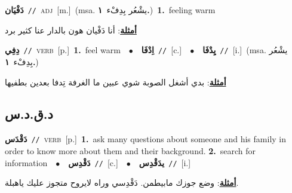 \documentclass[10pt,a4paper,twoside]{article} %
\begin{document}
\begin{multicols}{2}
{\setlength\topsep{0pt}\textbf{\foreignlanguage{arabic}{دَفْيَان}}\ {\color{gray}\texttt{//}\color{black}}\ \textsc{adj}\ [m.]\ \color{gray}(msa. \foreignlanguage{arabic}{يشْعُر بِدِفْء}~\foreignlanguage{arabic}{\textbf{١.}})\color{black}\ \textbf{1.}~feeling warm\  \begin{flushright}\color{gray}\foreignlanguage{arabic}{\textbf{\underline{\foreignlanguage{arabic}{أمثلة}}}: أنا دَفْيان هون بالدار عنا كثير برد}\end{flushright}\color{black}} \vspace{2mm}

{\setlength\topsep{0pt}\textbf{\foreignlanguage{arabic}{دِفِي}}\ {\color{gray}\texttt{//}\color{black}}\ \textsc{verb}\ [p.]\ \textbf{1.}~feel warm\ \ $\bullet$\ \ \setlength\topsep{0pt}\textbf{\foreignlanguage{arabic}{اِدْفَا}}\ {\color{gray}\texttt{//}\color{black}}\ [c.]\ \ $\bullet$\ \ \setlength\topsep{0pt}\textbf{\foreignlanguage{arabic}{يِدْفَا}}\ {\color{gray}\texttt{//}\color{black}}\ [i.]\ \color{gray}(msa. \foreignlanguage{arabic}{يشْعُر بِدِفْء}~\foreignlanguage{arabic}{\textbf{١.}})\color{black}\  \begin{flushright}\color{gray}\foreignlanguage{arabic}{\textbf{\underline{\foreignlanguage{arabic}{أمثلة}}}: بدي أشغل الصوبة شوي عبين ما الغرفة تِدفا بعدين بطفيها}\end{flushright}\color{black}} \vspace{2mm}

\vspace{-3mm}
\subsection*{\color{blue}\foreignlanguage{arabic}{د.ق.د.س}\color{blue}{}} 

{\setlength\topsep{0pt}\textbf{\foreignlanguage{arabic}{دَقْدَس}}\ {\color{gray}\texttt{//}\color{black}}\ \textsc{verb}\ [p.]\ \textbf{1.}~ask many questions about someone and his family in order to know more about them and their background.  \textbf{2.}~search for information\ \ $\bullet$\ \ \setlength\topsep{0pt}\textbf{\foreignlanguage{arabic}{دَقْدِس}}\ {\color{gray}\texttt{//}\color{black}}\ [c.]\ \ $\bullet$\ \ \setlength\topsep{0pt}\textbf{\foreignlanguage{arabic}{يدَقْدِس}}\ {\color{gray}\texttt{//}\color{black}}\ [i.]\  \begin{flushright}\color{gray}\foreignlanguage{arabic}{\textbf{\underline{\foreignlanguage{arabic}{أمثلة}}}: وضع جوزك مابيطمن. دَقْدِسي وراه لايروح متجوز عليك ياهبلة.}\end{flushright}\color{black}} \vspace{2mm}


\end{multicols}
\end{document}
